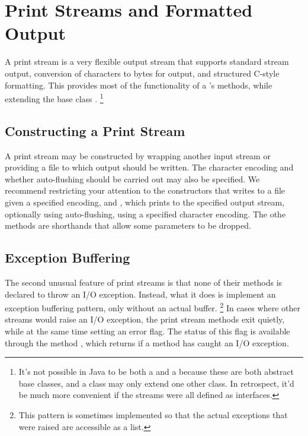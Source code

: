 \section{Print Streams and Formatted Output}\label{section:io-printstream-format}

A print stream is a very flexible output stream that supports standard
stream output, conversion of characters to bytes for output, and
structured C-style formatting.  This provides most of the
functionality of a 's methods, while extending the base
class .%
%
\footnote{It's not possible in Java to be both a  and a
   because these are both abstract base classes, and
  a class may only extend one other class.  In retrospect, it'd be
  much more convenient if the streams were all defined as interfaces.}

\subsection{Constructing a Print Stream}

A print stream may be constructed by wrapping another input stream or
providing a file to which output should be written.  The character
encoding and whether auto-flushing should be carried out may also be
specified.  We recommend restricting your attention to the
constructors  that writes to a file
given a specified encoding, and
, which prints to the
specified output stream, optionally using auto-flushing, using a
specified character encoding.  The othe methods are shorthands that
allow some parameters to be dropped.

\subsection{Exception Buffering}

The second unusual feature of print streams is that none of their
methods is declared to throw an I/O exception.  Instead, what it does
is implement an exception buffering pattern, only without an actual
buffer.%
%
\footnote{This pattern is sometimes implemented so
that the actual exceptions that were raised are accessible as a list.}
%
In cases where other streams would raise an I/O exception, the print
stream methods exit quietly, while at the same time setting an error
flag.  The status of this flag is available through the method
, which returns  if a method has caught
an I/O exception.

